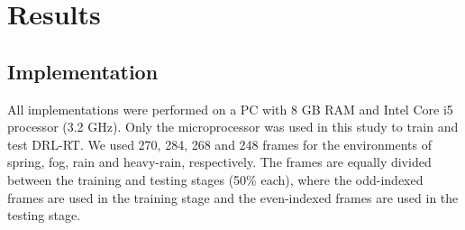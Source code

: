 \documentclass{svproc}
\begin{document}
\section{Results}
\subsection{Implementation} 
All implementations were performed on a PC with 8 GB RAM and Intel Core i5 processor (3.2 GHz). Only the microprocessor was used in this study to train and test DRL-RT. We used 270, 284, 268 and 248 frames for the environments of spring, fog, rain and heavy-rain, respectively. The frames are equally divided between the training and testing stages (50\% each), where the odd-indexed frames are used in the training stage and the even-indexed frames are used in the testing stage.
\end{document}
